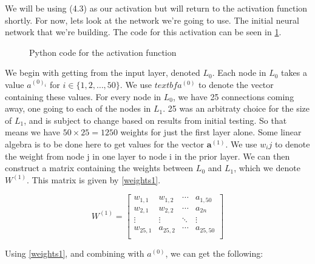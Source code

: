 We will be using (4.3) as our activation but will return to the activation function shortly. For now, lets look at the network we're going to use.
The initial neural network that we're building. The code for this activation can be seen in \ref{pyact}.

\begin{figure}
    
    \caption{Python code for the activation function}
    \label{pyact}
\end{figure}


We begin with getting from the input layer, denoted $L_0$. Each node in $L_0$ takes a value $a^{(0)_i}$ for $i \in \{1,2,\ldots,50\}$. We use $textbf{a}^(0)$ to denote the vector
containing these values. For every node in $L_0$, we have 25 connections coming away, one going to each of the nodes in $L_1$. 25 was an arbitraty choice for the size of $L_1$, and is
subject to change based on results from initial testing. So that means we have $50 \times 25 = 1250$ weights for just the first layer alone. Some linear algebra is to be done here to get 
values for the vector $\textbf{a}^{(1)}$. We use $w_ij$ to denote the weight from node j in one layer to node i in the prior layer. We can then construct a matrix containing the weights
between $L_0$ and $L_1$, which we denote $W^{(1)}$. This matrix is given by \ref{weights1}.

\begin{equation}
    W^{(1)} =
    \left[ {\begin{array}{cccc}
      w_{1,1} & w_{1,2} & \cdots & a_{1,50}\\
      w_{2,1} & w_{2,2} & \cdots & a_{2n}\\
      \vdots & \vdots & \ddots & \vdots\\
      w_{25,1} & a_{25,2} & \cdots & a_{25,50}\\
    \end{array} } \right]
    \label{weights1}
\end{equation}

Using \ref{weights1}, and combining with $a^{(0)}$, we can get the following:

